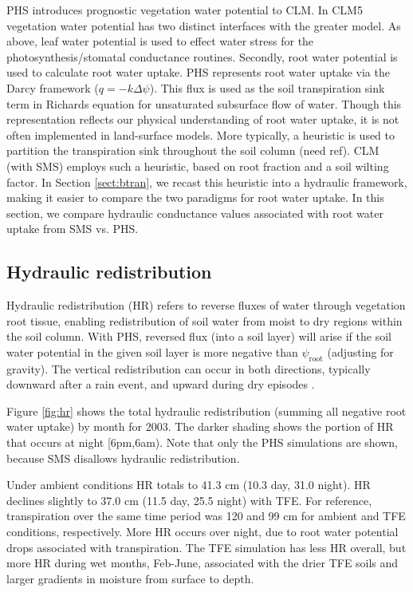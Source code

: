 \documentclass[draft,linenumbers]{agujournal}
\begin{document}
PHS introduces prognostic vegetation water potential to CLM.
In CLM5 vegetation water potential has two distinct interfaces with the greater model.
As above, leaf water potential is used to effect water stress for the photosynthesis/stomatal conductance routines.
Secondly, root water potential is used to calculate root water uptake.
PHS represents root water uptake via the Darcy framework ($q=-k\Delta\psi$).
This flux is used as the soil transpiration sink term in Richards equation for unsaturated subsurface flow of water.
Though this representation reflects our physical understanding of root water uptake, it is not often implemented in land-surface models.
More typically, a heuristic is used to partition the transpiration sink throughout the soil column (need ref).
CLM (with SMS) employs such a heuristic, based on root fraction and a soil wilting factor. 
In Section \ref{sect:btran}, we recast this heuristic into a hydraulic framework, making it easier to compare the two paradigms for root water uptake.
In this section, we compare hydraulic conductance values associated with root water uptake from SMS vs. PHS.


\subsection{Hydraulic redistribution}

Hydraulic redistribution (HR) refers to reverse fluxes of water through vegetation root tissue, enabling redistribution of soil water from moist to dry regions within the soil column.
With PHS, reversed flux (into a soil layer) will arise if the soil water potential in the given soil layer is more negative than $\psi_{\text{root}}$ (adjusting for gravity).
The vertical redistribution can occur in both directions, typically downward after a rain event, and upward during dry episodes \citep{burgess1998}.

Figure \ref{fig:hr} shows the total hydraulic redistribution (summing all negative root water uptake) by month for 2003. 
The darker shading shows the portion of HR that occurs at night [6pm,6am). 
Note that only the PHS simulations are shown, because SMS disallows hydraulic redistribution.

Under ambient conditions HR totals to 41.3 cm (10.3 day, 31.0 night). 
HR declines slightly to 37.0 cm (11.5 day, 25.5 night) with TFE.
For reference, transpiration over the same time period was 120 and 99 cm for ambient and TFE conditions, respectively.
More HR occurs over night, due to root water potential drops associated with transpiration.
The TFE simulation has less HR overall, but more HR during wet months, Feb-June, 
associated with the drier TFE soils and larger gradients in moisture from surface to depth.
\end{document}
